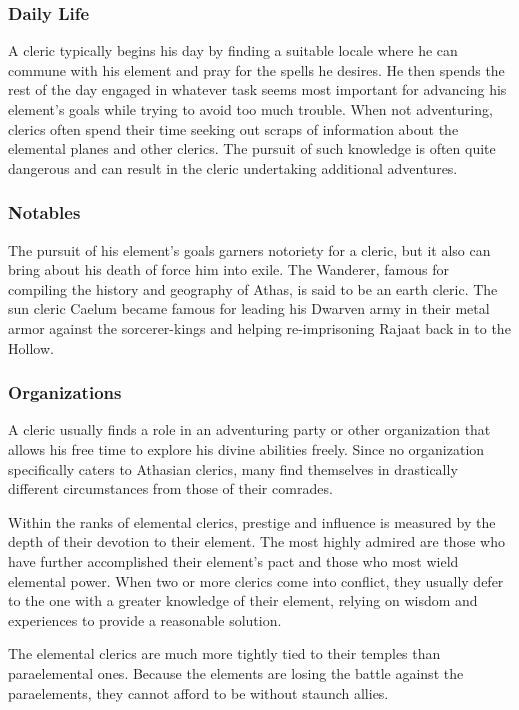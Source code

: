 \subsubsection{Daily Life}
A cleric typically begins his day by finding a suitable locale where he can commune with his element and pray for the spells he desires. He then spends the rest of the day engaged in whatever task seems most important for advancing his element's goals while trying to avoid too much trouble. When not adventuring, clerics often spend their time seeking out scraps of information about the elemental planes and other clerics. The pursuit of such knowledge is often quite dangerous and can result in the cleric undertaking additional adventures.

\subsubsection{Notables}
The pursuit of his element's goals garners notoriety for a cleric, but it also can bring about his death of force him into exile. The Wanderer, famous for compiling the history and geography of Athas, is said to be an earth cleric. The sun cleric Caelum became famous for leading his Dwarven army in their metal armor against the sorcerer-kings and helping re-imprisoning Rajaat back in to the Hollow.

\subsubsection{Organizations}
A cleric usually finds a role in an adventuring party or other organization that allows his free time to explore his divine abilities freely. Since no organization specifically caters to Athasian clerics, many find themselves in drastically different circumstances from those of their comrades.

Within the ranks of elemental clerics, prestige and influence is measured by the depth of their devotion to their element. The most highly admired are those who have further accomplished their element's pact and those who most wield elemental power. When two or more clerics come into conflict, they usually defer to the one with a greater knowledge of their element, relying on wisdom and experiences to provide a reasonable solution.

The elemental clerics are much more tightly tied to their temples than paraelemental ones. Because the elements are losing the battle against the paraelements, they cannot afford to be without staunch allies.

